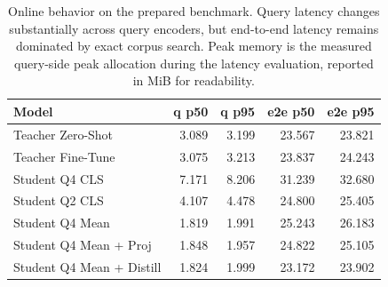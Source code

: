 \begin{table}[H]
\centering
\footnotesize
\renewcommand{\arraystretch}{1.05}
\caption{Online behavior on the prepared benchmark. Query latency changes substantially across query encoders, but end-to-end latency remains dominated by exact corpus search. Peak memory is the measured query-side peak allocation during the latency evaluation, reported in MiB for readability.}
\label{tab:latency-results}
\setlength{\tabcolsep}{3.2pt}
\begin{tabular}{@{}lrrrr@{}}
\toprule
Model & q p50 & q p95 & e2e p50 & e2e p95 \\
\midrule
Teacher Zero-Shot & 3.089 & 3.199 & 23.567 & 23.821 \\
Teacher Fine-Tune & 3.075 & 3.213 & 23.837 & 24.243 \\
Student Q4 CLS & 7.171 & 8.206 & 31.239 & 32.680 \\
Student Q2 CLS & 4.107 & 4.478 & 24.800 & 25.405 \\
Student Q4 Mean & 1.819 & 1.991 & 25.243 & 26.183 \\
Student Q4 Mean + Proj & 1.848 & 1.957 & 24.822 & 25.105 \\
Student Q4 Mean + Distill & 1.824 & 1.999 & 23.172 & 23.902 \\
\bottomrule
\end{tabular}
\end{table}
